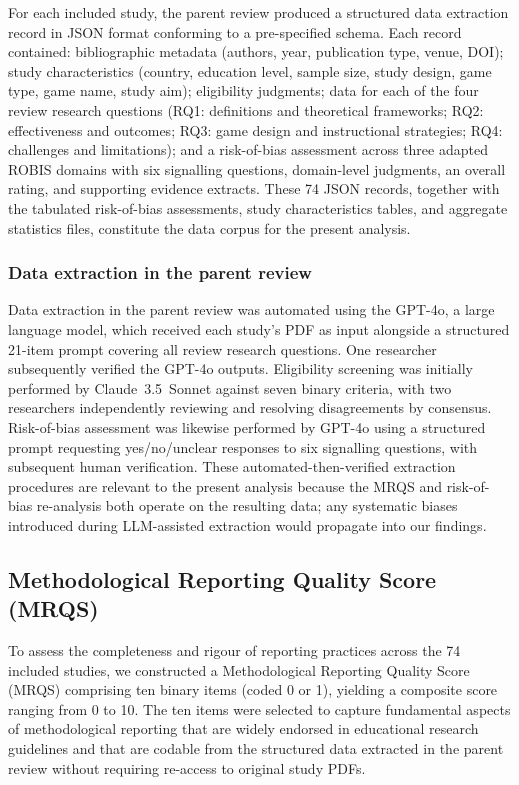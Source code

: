 \documentclass[etq]{acnsart}
\begin{document}
	For each included study, the parent review produced a structured data extraction record in JSON format conforming to a pre-specified schema. Each record contained: bibliographic metadata (authors, year, publication type, venue, DOI); study characteristics (country, education level, sample size, study design, game type, game name, study aim); eligibility judgments; data for each of the four review research questions (RQ1: definitions and theoretical frameworks; RQ2: effectiveness and outcomes; RQ3: game design and instructional strategies; RQ4: challenges and limitations); and a risk-of-bias assessment across three adapted ROBIS domains with six signalling questions, domain-level judgments, an overall rating, and supporting evidence extracts. These 74 JSON records, together with the tabulated risk-of-bias assessments, study characteristics tables, and aggregate statistics files, constitute the data corpus for the present analysis.
	
	\subsubsection{Data extraction in the parent review}
	
	Data extraction in the parent review was automated using the GPT-4o, a large language model, which received each study's PDF as input alongside a structured 21-item prompt covering all review research questions. One researcher subsequently verified the GPT-4o outputs. Eligibility screening was initially performed by Claude~3.5~Sonnet against seven binary criteria, with two researchers independently reviewing and resolving disagreements by consensus. Risk-of-bias assessment was likewise performed by GPT-4o using a structured prompt requesting yes/no/unclear responses to six signalling questions, with subsequent human verification. These automated-then-verified extraction procedures are relevant to the present analysis because the MRQS and risk-of-bias re-analysis both operate on the resulting data; any systematic biases introduced during LLM-assisted extraction would propagate into our findings.
	
	\subsection{Methodological Reporting Quality Score (MRQS)}
	\label{sec:methods_mrqs}
	
	To assess the completeness and rigour of reporting practices across the 74 included studies, we constructed a Methodological Reporting Quality Score (MRQS) comprising ten binary items (coded 0 or 1), yielding a composite score ranging from 0 to 10. The ten items were selected to capture fundamental aspects of methodological reporting that are widely endorsed in educational research guidelines \cite{Schulz2010CONSORT, HigginsThomas2019} and that are codable from the structured data extracted in the parent review without requiring re-access to original study PDFs.
	
\end{document}
